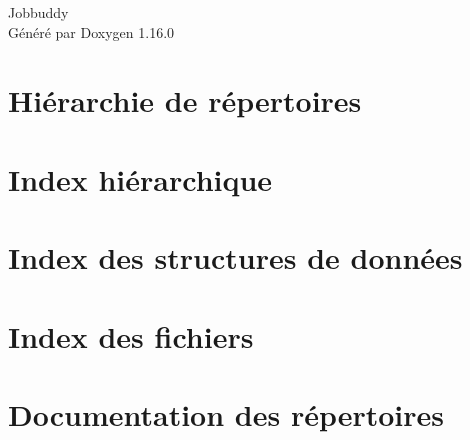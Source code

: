 \documentclass[twoside]{book}
\newcommand{\+}{\discretionary{\mbox{\scriptsize$\hookleftarrow$}}{}{}}
\newcommand{\clearemptydoublepage}{%
    \newpage{\pagestyle{empty}\cleardoublepage}%
  }
\begin{document}
  \raggedbottom
    \hypersetup{pageanchor=false,
                bookmarksnumbered=true,
                pdfencoding=unicode
               }
  \begin{titlepage}
  \vspace*{7cm}
  \begin{center}%
  {\Large Jobbuddy}\\
  \vspace*{1cm}
  {\large Généré par Doxygen 1.16.0}\\
  \end{center}
  \end{titlepage}
  \clearemptydoublepage
  \tableofcontents
  \clearemptydoublepage
  \hypersetup{pageanchor=true}








\chapter{Hiérarchie de répertoires}

\chapter{Index hiérarchique}

\chapter{Index des structures de données}

\chapter{Index des fichiers}

\chapter{Documentation des répertoires}







\end{document}
